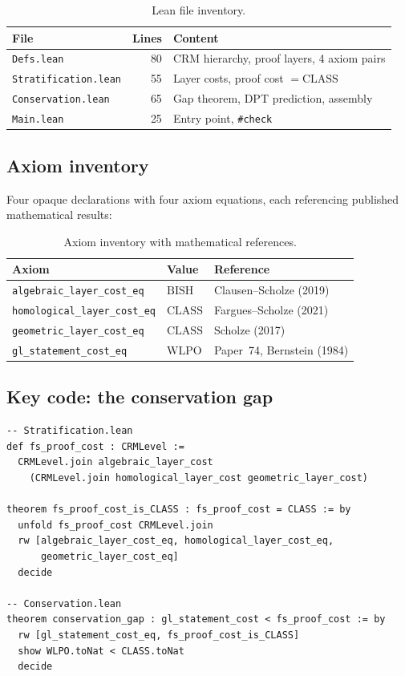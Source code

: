\documentclass[12pt, a4paper]{article}
\theoremstyle{plain}
\theoremstyle{definition}
\theoremstyle{remark}
\newcommand{\BISH}{\mathrm{BISH}}
\newcommand{\WLPO}{\mathrm{WLPO}}
\newcommand{\CLASS}{\mathrm{CLASS}}
\begin{document}
\begin{table}[h]
\centering
\begin{tabular}{lrl}
\toprule
\textbf{File} & \textbf{Lines} & \textbf{Content} \\
\midrule
\texttt{Defs.lean}           & 80  & CRM hierarchy, proof layers, 4 axiom pairs \\
\texttt{Stratification.lean} & 55  & Layer costs, proof cost $= \CLASS$ \\
\texttt{Conservation.lean}   & 65  & Gap theorem, DPT prediction, assembly \\
\texttt{Main.lean}           & 25  & Entry point, \texttt{\#check} \\
\bottomrule
\end{tabular}
\caption{Lean file inventory.}
\label{tab:files}
\end{table}

\subsection{Axiom inventory}

Four opaque declarations with four axiom equations, each referencing
published mathematical results:

\begin{table}[h]
\centering
\begin{tabular}{lll}
\toprule
\textbf{Axiom} & \textbf{Value} & \textbf{Reference} \\
\midrule
\texttt{algebraic\_layer\_cost\_eq}   & $\BISH$  & Clausen--Scholze (2019) \\
\texttt{homological\_layer\_cost\_eq} & $\CLASS$ & Fargues--Scholze (2021) \\
\texttt{geometric\_layer\_cost\_eq}   & $\CLASS$ & Scholze (2017) \\
\texttt{gl\_statement\_cost\_eq}      & $\WLPO$  & Paper~74, Bernstein (1984) \\
\bottomrule
\end{tabular}
\caption{Axiom inventory with mathematical references.}
\label{tab:axioms}
\end{table}

\subsection{Key code: the conservation gap}

\begin{lstlisting}
-- Stratification.lean
def fs_proof_cost : CRMLevel :=
  CRMLevel.join algebraic_layer_cost
    (CRMLevel.join homological_layer_cost geometric_layer_cost)

theorem fs_proof_cost_is_CLASS : fs_proof_cost = CLASS := by
  unfold fs_proof_cost CRMLevel.join
  rw [algebraic_layer_cost_eq, homological_layer_cost_eq,
      geometric_layer_cost_eq]
  decide

-- Conservation.lean
theorem conservation_gap : gl_statement_cost < fs_proof_cost := by
  rw [gl_statement_cost_eq, fs_proof_cost_is_CLASS]
  show WLPO.toNat < CLASS.toNat
  decide
\end{lstlisting}
\end{document}

